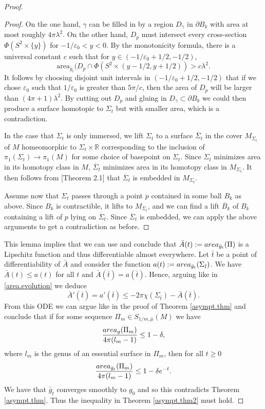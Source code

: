 \documentclass[11pt]{amsart}
\theoremstyle{remark}
\theoremstyle{definition}
\begin{document}
{{\begin{proof}
\begin{proof}
			On the one hand, $\gamma$ can be filled in by a region $D_{\gamma}$  in $\partial B_k$ with area at most roughly $4\pi\lambda^2$. On the other hand, $D_p$ must intersect every cross-section $\Phi(S^2 \times \{y \})$ for $- 1/{\varepsilon_0}<y<0$.  By the monotonicity formula, there is a universal constant $c$ such that for $y \in (-1/{\varepsilon_0}+1/2, -1/2)$, 	 
			\[
			\text{area}_{\bar g_t}(D_p \cap \Phi( S^2 \times (y-1/2,y+1/2)) > c    \lambda^{2}.    
			\]
			It follows by choosing disjoint unit intervals in $(-{1}/{\varepsilon_0}+1/2, -1/2)$ that if we chose ${\varepsilon_0}$ such that $1/{\varepsilon_0}$ is greater than $5\pi/c$, then the area of $D_p$ will be larger than $(4\pi+1)\lambda^2$.  By cutting out $D_p$ and gluing in $D_{\gamma} \subset \partial B_k$ we could then produce a surface homotopic to $\Sigma_{t}$ but with smaller area, which is a contradiction.  
			
			In the case that $\Sigma_t$ is only immersed, we lift $\Sigma_t$ to a surface $\overline{\Sigma}_t$ in the cover $M_{\Sigma_t}$ of $M$ homeomorphic to $\Sigma_t \times \mathbb{R}$ corresponding to the inclusion of $\pi_1(\Sigma_t) \rightarrow \pi_1(M)$ for some choice of basepoint on $\Sigma_t$.  Since $\Sigma_t$ minimizes area in its homotopy class in $M$,  $\overline{\Sigma}_t$ minimizes area in  its homotopy class in $M_{\Sigma_t}$.  It then follows from \cite{fhs}[Theorem 2.1] that $\overline{\Sigma}_t$ is embedded in $M_{\Sigma_t}$.  
			
			Assume now that $\Sigma_t$ passes through a point $p$ contained in some ball $B_k$ as above.  Since  $B_k$ is contractible, it lifts to  $M_{\Sigma_t}$, and we can find a lift $\overline{B}_k$ of $B_k$ containing a lift of $p$ lying on $\overline{\Sigma}_t$.  Since $\overline{\Sigma}_t$ is embedded, we can apply the above arguments to get a contradiction as before.  
			
			
		\end{proof}
		This lemma implies that we can use \cite[Lemma 9]{bben} and conclude that $\bar A(t):={\rm area}_{\bar g_t}(\Pi)$ is a  Lipschitz  function and thus differentiable almost everywhere. Let  $\bar t$ be a  point of differentiability of $\bar A$ and consider the function $a(t):= {\rm area}_{\bar g_t}(\Sigma_{\bar t})$. We have $\bar A(t)\leq a(t)$ for all $t$ and $\bar A(\bar t)=a(\bar t)$. Hence, arguing like in \eqref{area.evolution} we deduce
		$$\bar A'(\bar t)=a'(\bar t)\leq -2\pi\chi(\Sigma_{\bar t})-\bar A(\bar t).$$
		From this ODE we can argue like in the proof of Theorem \ref{asympt.thm} and conclude that if  for some sequence  $\Pi_m\in {S_{1/m,\bar\mu}(M)}$ we have $$\frac{{\rm area}_g(\Pi_m)}{4\pi(l_m-1)}\leq 1-\delta,$$
		where $l_m$ is the genus of an essential surface in $\Pi_m$, then  for all $t\geq 0$
		$$\frac{{\rm area}_{\bar g_t}(\Pi_m)}{4\pi(l_m-1)}\leq 1-\delta e^{-t}.$$
		We have that $\bar g_t$ converges smoothly to $g_0$ and so this contradicts Theorem \ref{asympt.thm}. Thus the inequality in Theorem \ref{asympt.thm2} must hold.
		

\end{proof}}}
\end{document}
